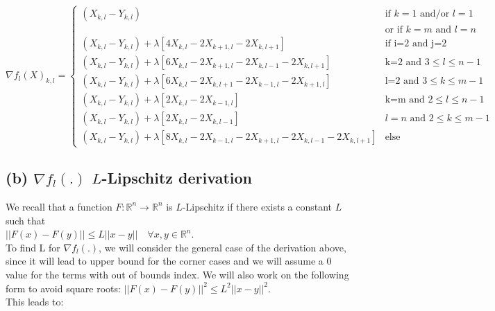\documentclass{article}
\begin{document}
$$
\nabla f_l(X)_{k,l} =  
                \begin{cases}
                (X_{k,l} - Y_{k,l})  & \text{if $k=1$ and/or $l=1$} \\
                                   & \text{or if $k=m$ and $l=n$}  \\
                (X_{k,l} - Y_{k,l}) + \lambda [4X_{k,l} - 2X_{k+1,l} - 2X_{k,l+1}]
                & \text{if i=2 and j=2} \\
                (X_{k,l} - Y_{k,l}) + \lambda[6X_{k,l} - 2X_{k+1,l} - 2X_{k,l-1}
                -2X_{k,l+1}]  
                & \text{k=2 and $3\leq l\leq n-1$} \\
                (X_{k,l} - Y_{k,l}) + \lambda[6X_{k,l} - 2X_{k,l+1} - 2X_{k-1,l}
                -2X_{k+1,l}]  
                & \text{l=2 and $3\leq k\leq m-1$} \\
                (X_{k,l} - Y_{k,l}) + \lambda[2X_{k,l} - 2X_{k-1,l}] 
                & \text{k=m and $2\leq l\leq n-1$} \\
                (X_{k,l} - Y_{k,l}) + \lambda[2X_{k,l} - 2X_{k,l-1}] 
                & \text{$l=n$ and $2\leq k\leq m-1$} \\
                (X_{k,l} - Y_{k,l}) + \lambda[8X_{k,l} - 2X_{k-1,l} - 2X_{k+1,l} 
                -2X_{k,l-1} - 2X_{k,l+1}] 
                & \text{else} 
                \end{cases}
$$


\subsection*{(b) $\nabla f_{l}(.)$ $L$-Lipschitz derivation}
We recall that a function $F : \mathbb{R}^n \to \mathbb{R}^n$ is $L$-Lipschitz if there exists 
a constant $L$ such that \\$ ||F(x) - F(y)|| \leq L||x-y|| \quad \forall x,y \in \mathbb{R}^n$. \\
To find L for $\nabla f_l(.)$, we will consider the general case of the derivation above, 
since it will lead to upper bound for the corner cases and we will assume a 0 value for
the terms with out of bounds index. We will also work on the following form to avoid square
roots: $||F(x) - F(y)||^2 \leq L^2||x-y||^2$. \\This leads to:
\end{document}
